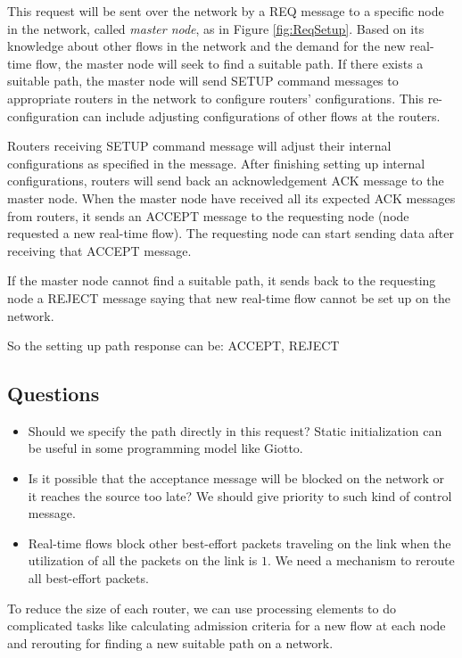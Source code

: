 \documentclass[a4]{article}
\begin{document}
This request will be sent over the network by a REQ message to a specific node
in the network, called {\em master node}, as in Figure \ref{fig:ReqSetup}.
Based on its knowledge about other flows in the network and the demand for the
new real-time flow, the master node will seek to find a suitable path. If there
exists a suitable path, the master node will send SETUP command messages to
appropriate routers in the network to configure routers' configurations. This
re-configuration can include adjusting configurations of other flows at the routers.

Routers receiving SETUP command message will adjust their internal
configurations as specified in the message. After finishing setting up internal
configurations, routers will send back an acknowledgement ACK message to
the master node. When the master node have received all its expected ACK
messages from routers, it sends an ACCEPT message to the requesting node
(node requested a new real-time flow). The requesting node can start sending
data after receiving that ACCEPT message.

If the master node cannot find a suitable path, it sends back to the requesting
node a REJECT message saying that new real-time flow cannot be set up on the
network.

So the setting up path response can be: ACCEPT, REJECT

\subsection{Questions}
\begin{itemize}
\item Should we specify the path directly in this request? Static initialization 
can be useful in some programming model like Giotto.	
\item Is it possible that the acceptance message will be blocked on the network 
or it reaches the source too late? We should give priority to such kind of control
message.
\item Real-time flows block other best-effort packets traveling on the link when 
the utilization of all the packets on the link is $1$. We need a mechanism to
reroute all best-effort packets.
\end{itemize}

To reduce the size of each router, we can use processing elements to do 
complicated tasks like calculating admission criteria for a new flow at each node 
and rerouting for finding a new suitable path on a network.
\end{document}
